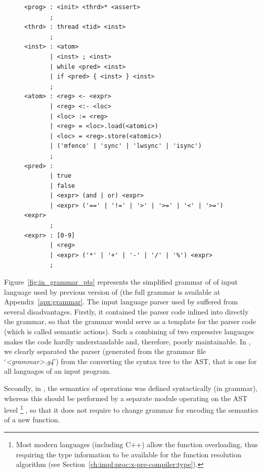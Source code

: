 \begin{figure}[!h]%
\centering
\begin{lstlisting}[language=antlr,
                  basicstyle=\ttfamily\tiny,
                  caption={The sketch of the input language grammar used by \oldporthos},%
                  label={fig:in_grammar_pts}]
<prog> : <init> <thrd>* <assert>
       ;
<thrd> : thread <tid> <inst>
       ;
<inst> : <atom>
       | <inst> ; <inst>
       | while <pred> <inst>
       | if <pred> { <inst> } <inst>
       ;
<atom> : <reg> <- <expr>
       | <reg> <:- <loc>
       | <loc> := <reg>
       | <reg> = <loc>.load(<atomic>)
       | <loc> = <reg>.store(<atomic>)
       | ('mfence' | 'sync' | 'lwsync' | 'isync')
       ;
<pred> :
       | true
       | false
       | <expr> (and | or) <expr>
       | <expr> ('==' | '!=' | '>' | '>=' | '<' | '>=') <expr>
       ;
<expr> : [0-9]
       | <reg>
       | <expr> ('*' | '+' | '-' | '/' | '%') <expr>
       ;
\end{lstlisting}
\end{figure}

Figure~\ref{fig:in_grammar_pts} represents the simplified grammar of of input language used by previous version of \porthos{} (the full  grammar is available at Appendix~\ref{apx:grammar}.
The input language parser used by \porthos{} suffered from several disadvantages.
Firstly, it contained the parser code inlined into directly the grammar, so that the grammar would serve as a template for the parser code (which is called semantic actions). Such a combining of two expressive languages makes the code hardly understandable and, therefore, poorly maintainable.
In \porthos[2], we clearly separated the parser (generated from the grammar file `\textit{<grammar>.g4}') from the converting the  syntax tree to the AST, that is one for all languages of an input program.

Secondly, in \porthos{}, the semantics of operations was defined syntactically (in  grammar), whereas this should be performed by a separate module operating on the AST level%
%
\footnote{Most modern languages (including C++) allow the function overloading, thus requiring the type information to be available for the function resolution algorithm (see Section~\ref{ch:impl:proc:x-pre-compiler:type}).}%
%
, so that it does not require to change grammar for encoding the semantics of a new function. %

